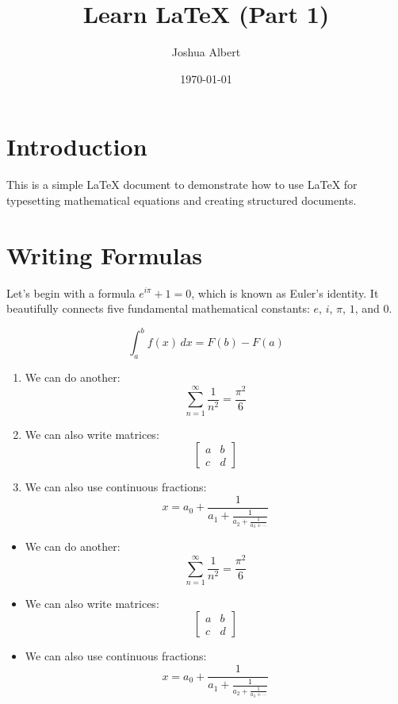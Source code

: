 \documentclass{article}
\title{Learn LaTeX (Part 1)}
\author{Joshua Albert}
\date{\today}
\begin{document}
\maketitle

\section{Introduction}
This is a simple LaTeX document to demonstrate how to use LaTeX for typesetting mathematical equations and creating structured documents.

\section{Writing Formulas}
Let's begin with a formula $e^{i\pi} + 1 = 0$, which is known as Euler's identity. It beautifully connects five fundamental mathematical constants: $e$, $i$, $\pi$, $1$, and $0$.

$$\int_{a}^{b} f(x) \, dx = F(b) - F(a)$$

\begin{enumerate}

\item We can do another:
$$\sum_{n=1}^{\infty} \frac{1}{n^2} = \frac{\pi^2}{6}$$

\item We can also write matrices:
$$\begin{bmatrix}
a & b \\
c & d
\end{bmatrix}$$

\item We can also use continuous fractions:
$$x = a_0 + \frac{1}{a_1 + \frac{1}{a_2 + \frac{1}{a_3 + \cdots}}}$$

\end{enumerate}

\begin{itemize}

\item We can do another:
$$\sum_{n=1}^{\infty} \frac{1}{n^2} = \frac{\pi^2}{6}$$

\item We can also write matrices:
$$\begin{bmatrix}
a & b \\
c & d
\end{bmatrix}$$

\item We can also use continuous fractions:
$$x = a_0 + \frac{1}{a_1 + \frac{1}{a_2 + \frac{1}{a_3 + \cdots}}}$$

\end{itemize}
\end{document}
